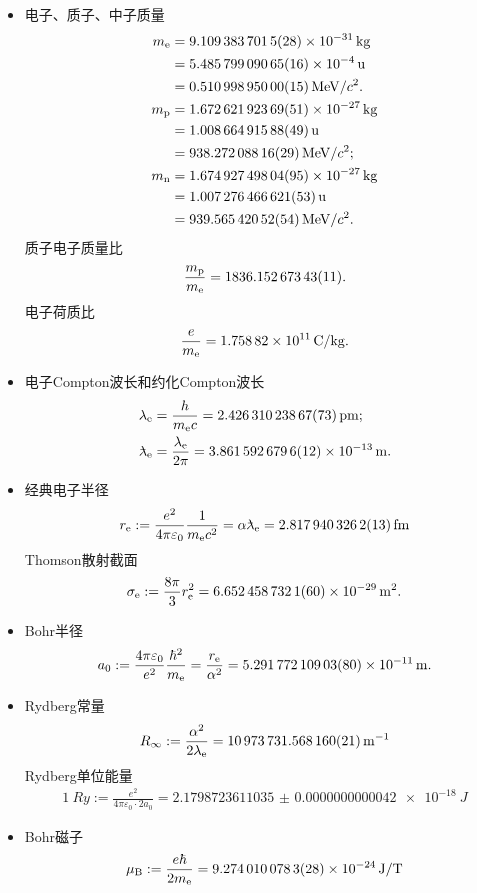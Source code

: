 \begin{itemize}
	\item 电子、质子、中子质量
		\begin{align}
			m_\elc&=\SI{9.1093837015(28)E-31}{kg}\\
			&=\SI{5.48579909065(16)E-4}{u}\\
			&=\SI{0.51099895000(15)}{MeV}/c^2.\\
			m_\pton&=\SI{1.67262192369(51)E-27}{kg}\\
			&=\SI{1.00866491588(49)}{u}\\
			&=\SI{938.27208816(29)}{MeV}/c^2;\\
			m_\nton&=\SI{1.67492749804(95)E-27}{kg}\\
			&=\SI{1.007276466621(53)}{u}\\
			&=\SI{939.56542052(54)}{MeV}/c^2.
		\end{align}
		质子电子质量比
		\begin{align}
			\frac{m_\pton}{m_\elc}=\num{1836.15267343(11)}.
		\end{align}
		电子荷质比
		\begin{align}
			\frac e{m_\elc}=\SI{1.75882E11}{C/kg}.
		\end{align}
	
	\item 电子Compton波长和约化Compton波长
		\begin{align}
			\lambda_\elc&=\frac h{m_\elc c}=\SI{2.42631023867(73)}{pm};\\
			\lambdabar_\elc&=\frac{\lambda_\elc}{2\pi}=\SI{3.861 592 6796(12)E-13}{m}.
		\end{align}
	
	\item 经典电子半径
		\begin{align}
			r_\elc:=\frac{e^2}{4\pi\varepsilon_0}\frac1{m_\elc c^2}=\alpha\lambdabar_\elc=\SI{2.8179403262(13)}{fm}
		\end{align}
		Thomson散射截面
		\begin{align}
			\sigma_\elc:=\frac{8\pi}3r_\elc^2=\SI{6.6524587321(60)E-29}{m^2}.
		\end{align}
	
	
	
	\item Bohr半径
		\begin{align}
			a_0:=\frac{4\pi\varepsilon_0}{e^2}\frac{\hbar^2}{m_\elc}=\frac{r_\elc}{\alpha^2}=\SI{5.29177210903(80)E-11}{m}.
		\end{align}
	\item Rydberg常量
		\begin{align}
			R_\infty:=\frac{\alpha^2}{2\lambda_\elc}=\SI{10973731.568160(21)}{m^{-1}}
		\end{align}
		Rydberg单位能量
		\begin{align}
			\SI{1}{Ry}:=\frac{e^2}{4\pi\varepsilon_0\cdot 2a_0}=\SI{2.1798723611035(42)e-18}{J}
		\end{align}
	
	\item Bohr磁子
		\begin{align}
			\muB:=\frac{e\hbar}{2m_\elc}=\SI{9.2740100783(28)E-24}{J/T}
		\end{align}
\end{itemize}
